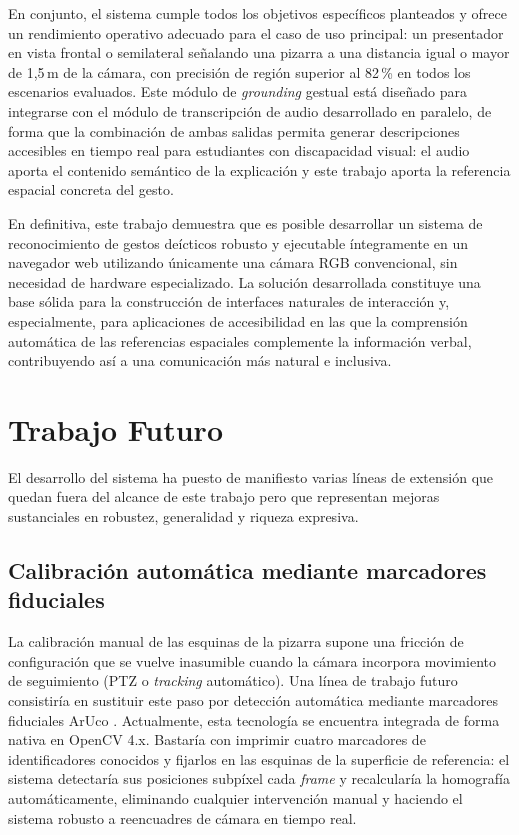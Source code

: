 \documentclass[12pt]{report} %
\begin{document}
En conjunto, el sistema cumple todos los objetivos específicos planteados y ofrece un rendimiento operativo adecuado para el caso de uso principal: un presentador en vista frontal o semilateral señalando una pizarra a una distancia igual o mayor de 1{,}5\,m de la cámara, con precisión de región superior al 82\,\% en todos los escenarios evaluados. Este módulo de \textit{grounding} gestual está diseñado para integrarse con el módulo de transcripción de audio desarrollado en paralelo, de forma que la combinación de ambas salidas permita generar descripciones accesibles en tiempo real para estudiantes con discapacidad visual: el audio aporta el contenido semántico de la explicación y este trabajo aporta la referencia espacial concreta del gesto.

En definitiva, este trabajo demuestra que es posible desarrollar un sistema de reconocimiento de gestos deícticos robusto y ejecutable íntegramente en un navegador web utilizando únicamente una cámara RGB convencional, sin necesidad de hardware especializado. La solución desarrollada constituye una base sólida para la construcción de interfaces naturales de interacción y, especialmente, para aplicaciones de accesibilidad en las que la comprensión automática de las referencias espaciales complemente la información verbal, contribuyendo así a una comunicación más natural e inclusiva.




\section{Trabajo Futuro}
\label{sec:trabajo_futuro}

El desarrollo del sistema ha puesto de manifiesto varias líneas de extensión que quedan fuera del alcance de este trabajo pero que representan mejoras sustanciales en robustez, generalidad y riqueza expresiva.

\subsection{Calibración automática mediante marcadores fiduciales}

La calibración manual de las esquinas de la pizarra supone una fricción de configuración que se vuelve inasumible cuando la cámara incorpora movimiento de seguimiento (PTZ o \textit{tracking} automático). Una línea de trabajo futuro consistiría en sustituir este paso por detección automática mediante marcadores fiduciales ArUco \citep{garrido2014automatic}. Actualmente, esta tecnología se encuentra integrada de forma nativa en OpenCV 4.x. Bastaría con imprimir cuatro marcadores de identificadores conocidos y fijarlos en las esquinas de la superficie de referencia: el sistema detectaría sus posiciones subpíxel cada \textit{frame} y recalcularía la homografía automáticamente, eliminando cualquier intervención manual y haciendo el sistema robusto a reencuadres de cámara en tiempo real.
\end{document}
